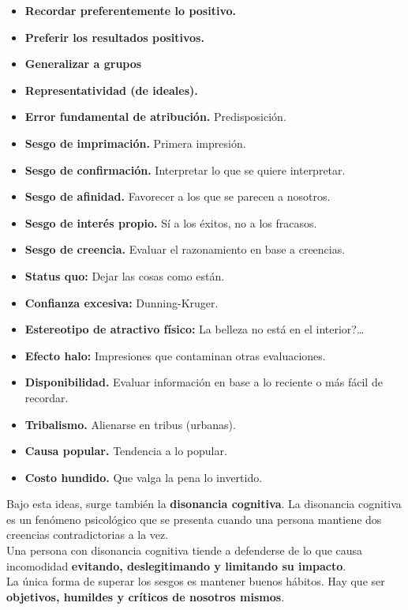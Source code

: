 \begin{itemize}
\item{\textbf{Recordar preferentemente lo positivo.}}
\item{\textbf{Preferir los resultados positivos.}}
\item{\textbf{Generalizar a grupos}}
\item{\textbf{Representatividad (de ideales).}}
\item{\textbf{Error fundamental de atribución.} Predisposición.}
\item{\textbf{Sesgo de imprimación.} Primera impresión.}
\item{\textbf{Sesgo de confirmación.} Interpretar lo que se quiere interpretar.}
  \item{\textbf{Sesgo de afinidad.} Favorecer a los que se
        parecen a nosotros.}
  \item{\textbf{Sesgo de interés propio.} Sí a los éxitos, no
        a los fracasos.}
  \item{\textbf{Sesgo de creencia.} Evaluar el razonamiento
        en base a creencias.}
\item{\textbf{Status quo:} Dejar las cosas como están.}
\item{\textbf{Confianza excesiva:} Dunning-Kruger.}
  \item{\textbf{Estereotipo de atractivo físico:} La belleza
        no está en el interior?\ldots}
  \item{\textbf{Efecto halo:} Impresiones que contaminan
        otras evaluaciones.}
  \item{\textbf{Disponibilidad.} Evaluar información en base
        a lo reciente o más fácil de recordar.}
\item{\textbf{Tribalismo.} Alienarse en tribus (urbanas).}
\item{\textbf{Causa popular.} Tendencia a lo popular.}
  \item{\textbf{Costo hundido.} Que valga la pena lo
        invertido.}
\end{itemize}

Bajo esta ideas, surge también la \textbf{disonancia
  cognitiva}. La disonancia cognitiva es un fenómeno
psicológico que se presenta cuando una persona mantiene
dos creencias contradictorias a la vez. \\

Una persona con disonancia cognitiva tiende a defenderse
de lo que causa incomodidad \textbf{evitando, deslegitimando
  y limitando su impacto}. \\

La única forma de superar los sesgos es mantener buenos
hábitos. Hay que ser \textbf{objetivos, humildes y críticos
de nosotros mismos}.
